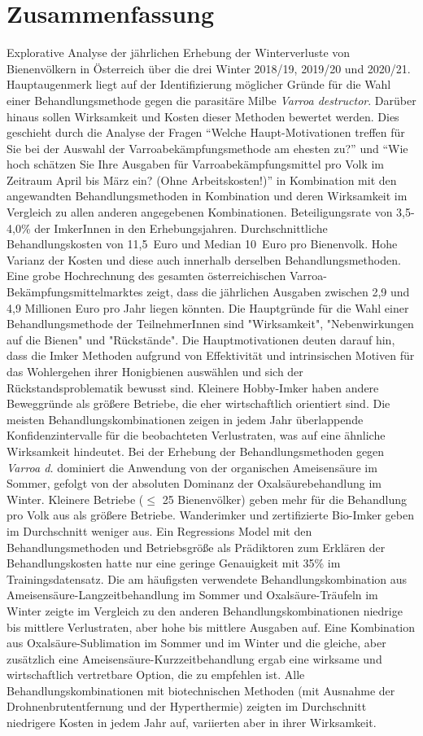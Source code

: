 \chapter*{Zusammenfassung}
\label{sec:Zusammenfassung}
\vspace*{-10mm}

Explorative Analyse der jährlichen Erhebung der Winterverluste von Bienenvölkern in Österreich über die drei Winter 2018/19, 2019/20 und 2020/21. Hauptaugenmerk liegt auf der Identifizierung möglicher Gründe für die Wahl einer Behandlungsmethode gegen die parasitäre Milbe \textit{Varroa destructor}. Darüber hinaus sollen Wirksamkeit und Kosten dieser Methoden bewertet werden. Dies geschieht durch die Analyse der Fragen \enquote{Welche Haupt-Motivationen treffen für Sie bei der Auswahl der Varroabekämpfungsmethode am ehesten zu?} und \enquote{Wie hoch schätzen Sie Ihre Ausgaben für Varroabekämpfungsmittel pro Volk im Zeitraum April bis März ein? (Ohne Arbeitskosten!)} in Kombination mit den angewandten Behandlungsmethoden in Kombination und deren Wirksamkeit im Vergleich zu allen anderen angegebenen Kombinationen. Beteiligungsrate von 3,5-4,0\% der ImkerInnen in den Erhebungsjahren. Durchschnittliche Behandlungskosten von 11,5~Euro und Median 10~Euro pro Bienenvolk. Hohe Varianz der Kosten und diese auch innerhalb derselben Behandlungsmethoden. Eine grobe Hochrechnung des gesamten österreichischen Varroa-Bekämpfungsmittelmarktes zeigt, dass die jährlichen Ausgaben zwischen 2,9 und 4,9 Millionen Euro pro Jahr liegen könnten. Die Hauptgründe für die Wahl einer Behandlungsmethode der TeilnehmerInnen sind "Wirksamkeit", "Nebenwirkungen auf die Bienen" und "Rückstände". Die Hauptmotivationen deuten darauf hin, dass die Imker Methoden aufgrund von Effektivität und intrinsischen Motiven für das Wohlergehen ihrer Honigbienen auswählen und sich der Rückstandsproblematik bewusst sind. Kleinere Hobby-Imker haben andere Beweggründe als größere Betriebe, die eher wirtschaftlich orientiert sind. Die meisten Behandlungskombinationen zeigen in jedem Jahr überlappende Konfidenzintervalle für die beobachteten Verlustraten, was auf eine ähnliche Wirksamkeit hindeutet. Bei der Erhebung der Behandlungsmethoden gegen \textit{Varroa d.} dominiert die Anwendung von der organischen Ameisensäure im Sommer, gefolgt von der absoluten Dominanz der Oxalsäurebehandlung im Winter. Kleinere Betriebe ($\leq$ 25 Bienenvölker) geben mehr für die Behandlung pro Volk aus als größere Betriebe. Wanderimker und zertifizierte Bio-Imker geben im Durchschnitt weniger aus. Ein Regressions Model mit den Behandlungsmethoden und Betriebsgröße als Prädiktoren zum Erklären der Behandlungskosten hatte nur eine geringe Genauigkeit mit 35\% im Trainingsdatensatz. Die am häufigsten verwendete Behandlungskombination aus Ameisensäure-Langzeitbehandlung im Sommer und Oxalsäure-Träufeln im Winter zeigte im Vergleich zu den anderen Behandlungskombinationen niedrige bis mittlere Verlustraten, aber hohe bis mittlere Ausgaben auf. Eine Kombination aus Oxalsäure-Sublimation im Sommer und im Winter und die gleiche, aber zusätzlich eine Ameisensäure-Kurzzeitbehandlung ergab eine wirksame und wirtschaftlich vertretbare Option, die zu empfehlen ist. Alle Behandlungskombinationen mit biotechnischen Methoden (mit Ausnahme der Drohnenbrutentfernung und der Hyperthermie) zeigten im Durchschnitt niedrigere Kosten in jedem Jahr auf, variierten aber in ihrer Wirksamkeit.


